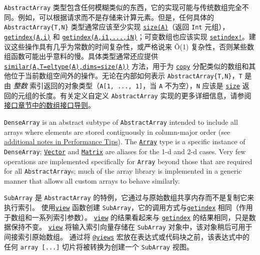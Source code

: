 \texttt{AbstractArray} 类型包含任何模糊类似的东西，它的实现可能与传统数组完全不同。例如，可以根据请求而不是存储来计算元素。但是，任何具体的 \texttt{AbstractArray\{T,N\}} 类型通常应该至少实现 \hyperlink{17888996102305087038}{\texttt{size(A)}}（返回 \texttt{Int} 元组），\hyperlink{2839226020402435013}{\texttt{getindex(A,i)}} 和 \hyperlink{13720608614876840481}{\texttt{getindex(A,i1,...,iN)}}；可变数组也应该实现 \hyperlink{1309244355901386657}{\texttt{setindex!}}。建议这些操作具有几乎为常数的时间复杂性，或严格说来 Õ(1) 复杂性，否则某些数组函数可能出乎意料的慢。具体类型通常还应提供 \hyperlink{15525808546723795098}{\texttt{similar(A,T=eltype(A),dims=size(A))}} 方法，用于为 \hyperlink{15665284441316555522}{\texttt{copy}} 分配类似的数组和其他位于当前数组空间外的操作。无论在内部如何表示 \texttt{AbstractArray\{T,N\}}，\texttt{T} 是由 \emph{整数} 索引返回的对象类型（\texttt{A[1, ..., 1]}，当 \texttt{A} 不为空），\texttt{N} 应该是 \hyperlink{17888996102305087038}{\texttt{size}} 返回的元组的长度。有关定义自定义 \texttt{AbstractArray} 实现的更多详细信息，请参阅\hyperlink{9718377734213742156}{接口章节中的数组接口导则}。



\texttt{DenseArray} is an abstract subtype of \texttt{AbstractArray} intended to include all arrays where elements are stored contiguously in column-major order (see \hyperlink{11239800376478112527}{additional notes in Performance Tips}). The \hyperlink{15492651498431872487}{\texttt{Array}} type is a specific instance of \texttt{DenseArray};  \hyperlink{10571362059486397014}{\texttt{Vector}} and \hyperlink{5448927444601277512}{\texttt{Matrix}} are aliases for the 1-d and 2-d cases. Very few operations are implemented specifically for \texttt{Array} beyond those that are required for all \texttt{AbstractArray}s; much of the array library is implemented in a generic manner that allows all custom arrays to behave similarly.



\texttt{SubArray} 是 \texttt{AbstractArray} 的特例，它通过与原始数组共享内存而不是复制它来执行索引。 使用\hyperlink{4861450464669906845}{\texttt{view}} 函数创建 \texttt{SubArray}，它的调用方式与\hyperlink{13720608614876840481}{\texttt{getindex}} 相同（作用于数组和一系列索引参数）。 \hyperlink{4861450464669906845}{\texttt{view}} 的结果看起来与 \hyperlink{13720608614876840481}{\texttt{getindex}} 的结果相同，只是数据保持不变。 \hyperlink{4861450464669906845}{\texttt{view}} 将输入索引向量存储在 \texttt{SubArray} 对象中，该对象稍后可用于间接索引原始数组。 通过将  \hyperlink{4544474300423667148}{\texttt{@views}} 宏放在表达式或代码块之前，该表达式中的任何 \texttt{array [...]} 切片将被转换为创建一个 \texttt{SubArray} 视图。



